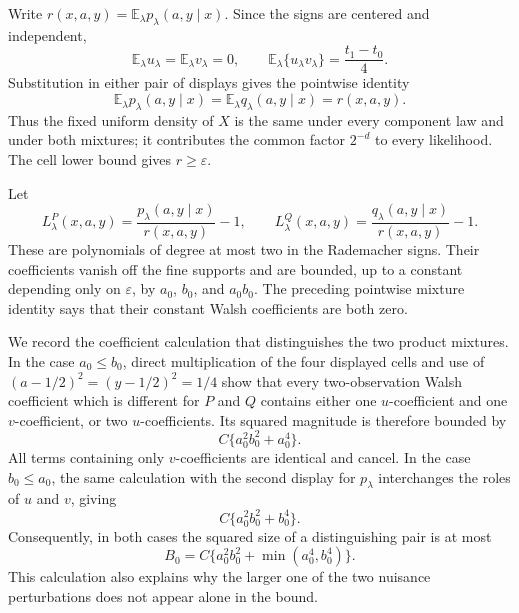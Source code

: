 Write \(r(x,a,y)=\mathbb E_\lambda p_\lambda(a,y\mid x)\). Since the signs are centered and independent,
\[
\mathbb E_\lambda u_\lambda=\mathbb E_\lambda v_\lambda=0,
\qquad
\mathbb E_\lambda\{u_\lambda v_\lambda\}=\frac{t_1-t_0}{4}.
\]
Substitution in either pair of displays gives the pointwise identity
\[
\mathbb E_\lambda p_\lambda(a,y\mid x)
=\mathbb E_\lambda q_\lambda(a,y\mid x)
=r(x,a,y).
\]
Thus the fixed uniform density of \(X\) is the same under every component law and under both mixtures; it contributes the common factor \(2^{-d}\) to every likelihood. The cell lower bound gives \(r\ge\varepsilon\).

Let
\[
L^P_\lambda(x,a,y)=\frac{p_\lambda(a,y\mid x)}{r(x,a,y)}-1,
\qquad
L^Q_\lambda(x,a,y)=\frac{q_\lambda(a,y\mid x)}{r(x,a,y)}-1.
\]
These are polynomials of degree at most two in the Rademacher signs. Their coefficients vanish off the fine supports and are bounded, up to a constant depending only on \(\varepsilon\), by \(a_0\), \(b_0\), and \(a_0b_0\). The preceding pointwise mixture identity says that their constant Walsh coefficients are both zero.

We record the coefficient calculation that distinguishes the two product mixtures. In the case \(a_0\le b_0\), direct multiplication of the four displayed cells and use of \((a-1/2)^2=(y-1/2)^2=1/4\) show that every two-observation Walsh coefficient which is different for \(P\) and \(Q\) contains either one \(u\)-coefficient and one \(v\)-coefficient, or two \(u\)-coefficients. Its squared magnitude is therefore bounded by
\[
C\{a_0^2b_0^2+a_0^4\}.
\]
All terms containing only \(v\)-coefficients are identical and cancel. In the case \(b_0\le a_0\), the same calculation with the second display for \(p_\lambda\) interchanges the roles of \(u\) and \(v\), giving
\[
C\{a_0^2b_0^2+b_0^4\}.
\]
Consequently, in both cases the squared size of a distinguishing pair is at most
\[
B_0=C\{a_0^2b_0^2+\min(a_0^4,b_0^4)\}.
\]
This calculation also explains why the larger one of the two nuisance perturbations does not appear alone in the bound.

